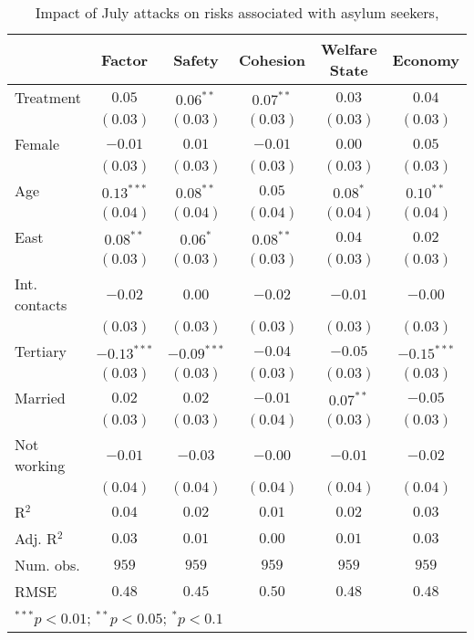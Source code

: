 
\begin{table}
\caption{Impact of July attacks on risks associated with asylum seekers, }
\begin{center}
\begin{tabular}{l c c c c c}
\toprule
 & Factor & Safety & Cohesion & Welfare State & Economy \\
\midrule
Treatment     & $0.05$        & $0.06^{**}$   & $0.07^{**}$ & $0.03$      & $0.04$        \\
              & $(0.03)$      & $(0.03)$      & $(0.03)$    & $(0.03)$    & $(0.03)$      \\
Female        & $-0.01$       & $0.01$        & $-0.01$     & $0.00$      & $0.05$        \\
              & $(0.03)$      & $(0.03)$      & $(0.03)$    & $(0.03)$    & $(0.03)$      \\
Age           & $0.13^{***}$  & $0.08^{**}$   & $0.05$      & $0.08^{*}$  & $0.10^{**}$   \\
              & $(0.04)$      & $(0.04)$      & $(0.04)$    & $(0.04)$    & $(0.04)$      \\
East          & $0.08^{**}$   & $0.06^{*}$    & $0.08^{**}$ & $0.04$      & $0.02$        \\
              & $(0.03)$      & $(0.03)$      & $(0.03)$    & $(0.03)$    & $(0.03)$      \\
Int. contacts & $-0.02$       & $0.00$        & $-0.02$     & $-0.01$     & $-0.00$       \\
              & $(0.03)$      & $(0.03)$      & $(0.03)$    & $(0.03)$    & $(0.03)$      \\
Tertiary      & $-0.13^{***}$ & $-0.09^{***}$ & $-0.04$     & $-0.05$     & $-0.15^{***}$ \\
              & $(0.03)$      & $(0.03)$      & $(0.03)$    & $(0.03)$    & $(0.03)$      \\
Married       & $0.02$        & $0.02$        & $-0.01$     & $0.07^{**}$ & $-0.05$       \\
              & $(0.03)$      & $(0.03)$      & $(0.04)$    & $(0.03)$    & $(0.03)$      \\
Not working   & $-0.01$       & $-0.03$       & $-0.00$     & $-0.01$     & $-0.02$       \\
              & $(0.04)$      & $(0.04)$      & $(0.04)$    & $(0.04)$    & $(0.04)$      \\
\midrule
R$^2$         & $0.04$        & $0.02$        & $0.01$      & $0.02$      & $0.03$        \\
Adj. R$^2$    & $0.03$        & $0.01$        & $0.00$      & $0.01$      & $0.03$        \\
Num. obs.     & $959$         & $959$         & $959$       & $959$       & $959$         \\
RMSE          & $0.48$        & $0.45$        & $0.50$      & $0.48$      & $0.48$        \\
\bottomrule
\multicolumn{6}{l}{\scriptsize{$^{***}p<0.01$; $^{**}p<0.05$; $^{*}p<0.1$}}
\end{tabular}
\label{tab_risk}
\end{center}
\end{table}
